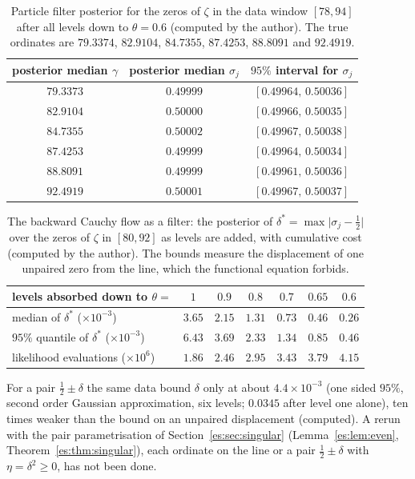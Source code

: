 \begin{table}[h]
\centering
\begin{tabular}{ccc}
\toprule
posterior median $\gamma$ & posterior median $\sigma_j$ & $95\%$ interval for $\sigma_j$\\
\midrule
$79.3373$ & $0.49999$ & $[0.49964,\,0.50036]$\\
$82.9104$ & $0.50000$ & $[0.49966,\,0.50035]$\\
$84.7355$ & $0.50002$ & $[0.49967,\,0.50038]$\\
$87.4253$ & $0.49999$ & $[0.49964,\,0.50034]$\\
$88.8091$ & $0.49999$ & $[0.49961,\,0.50036]$\\
$92.4919$ & $0.50001$ & $[0.49967,\,0.50037]$\\
\bottomrule
\end{tabular}
\caption{Particle filter posterior for the zeros of $\zeta$ in the data window $[78,94]$ after all levels down to $\theta=0.6$ (computed by the author). The true ordinates are $79.3374$, $82.9104$, $84.7355$, $87.4253$, $88.8091$ and $92.4919$.}
\label{cf:tab:zeta}
\end{table}

\begin{table}[h]
\centering
\begin{tabular}{lcccccc}
\toprule
levels absorbed down to $\theta=$ & $1$ & $0.9$ & $0.8$ & $0.7$ & $0.65$ & $0.6$\\
\midrule
median of $\delta^\ast$ ($\times10^{-3}$) & $3.65$ & $2.15$ & $1.31$ & $0.73$ & $0.46$ & $0.26$\\
$95\%$ quantile of $\delta^\ast$ ($\times10^{-3}$) & $6.43$ & $3.69$ & $2.33$ & $1.34$ & $0.85$ & $0.46$\\
likelihood evaluations ($\times10^{6}$) & $1.86$ & $2.46$ & $2.95$ & $3.43$ & $3.79$ & $4.15$\\
\bottomrule
\end{tabular}
\caption{The backward Cauchy flow as a filter: the posterior of $\delta^\ast=\max\lvert\sigma_j-\frac12\rvert$ over the zeros of $\zeta$ in $[80,92]$ as levels are added, with cumulative cost (computed by the author). The bounds measure the displacement of one unpaired zero from the line, which the functional equation forbids.}
\label{cf:tab:flow}
\end{table}

For a pair $\frac12\pm\delta$ the same data bound $\delta$ only at about $4.4\times10^{-3}$ (one sided $95\%$, second order Gaussian approximation, six levels; $0.0345$ after level one alone), ten times weaker than the bound on an unpaired displacement (computed). A rerun with the pair parametrisation of Section~\ref{es:sec:singular} (Lemma~\ref{es:lem:even}, Theorem~\ref{es:thm:singular}), each ordinate on the line or a pair $\frac12\pm\delta$ with $\eta=\delta^2\ge0$, has not been done.

